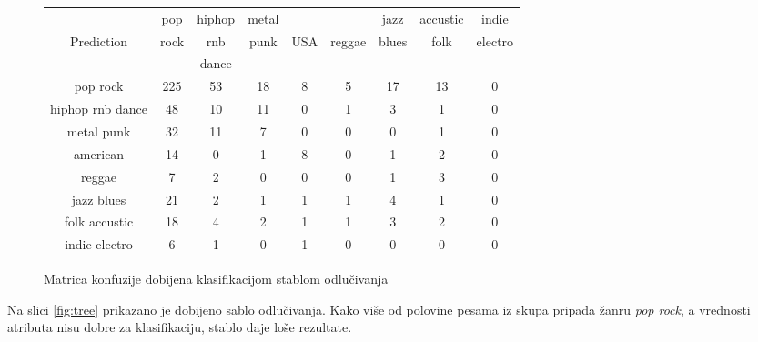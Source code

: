 \begin{center}
\begin{figure}[H]
    \centering
    \footnotesize
    \begin{tabular}{|c|c|c|c|c|c|c|c|c|}
        \hline
        & pop & hiphop & metal & & & jazz & accustic & indie \\
        Prediction & rock & rnb & punk & USA & reggae & blues & folk & electro \\
        & & dance & & & & & & \\
        \hline
        pop rock & 225 & 53 & 18 & 8 & 5 & 17 & 13 & 0 \\
        hiphop rnb dance & 48 & 10 & 11 & 0 & 1 & 3 & 1 & 0 \\
        metal punk & 32 & 11 & 7 & 0 & 0 & 0 & 1 & 0 \\
        american & 14 & 0 & 1 & 8 & 0 & 1 & 2 & 0 \\
        reggae & 7 & 2 & 0 & 0 & 0 & 1 & 3 & 0 \\
        jazz blues & 21 & 2 & 1 & 1 & 1 & 4 & 1 & 0 \\
        folk accustic & 18 & 4 & 2 & 1 & 1 & 3 & 2 & 0 \\
        indie electro & 6 & 1 & 0 & 1 & 0 & 0 & 0 & 0 \\
        \hline
    \end{tabular}
    \caption{Matrica konfuzije dobijena klasifikacijom stablom odlu\v{c}ivanja}
    \label{fig:confmatrtree}
\end{figure}
\end{center}

Na slici \ref{fig:tree} prikazano je dobijeno sablo odlu\v{c}ivanja. Kako vi\v{s}e od polovine pesama iz skupa pripada \v{z}anru \emph{pop rock}, a vrednosti atributa nisu dobre za klasifikaciju, stablo daje lo\v{s}e rezultate.


